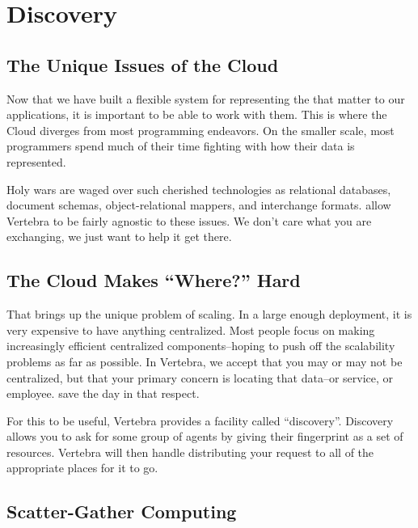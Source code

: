 \section{Discovery}


\subsection{The Unique Issues of the Cloud}

Now that we have built a flexible system for representing the \resources{} that matter to our applications, it is important to be able to work with them.  This is where the Cloud diverges from most programming endeavors.  On the smaller scale, most programmers spend much of their time fighting with how their data is represented.

Holy wars are waged over such cherished technologies as relational databases, document schemas, object-relational mappers, and interchange formats.  \Resources{} allow Vertebra to be fairly agnostic to these issues.  We don't care what you are exchanging, we just want to help it get there.

\subsection{The Cloud Makes ``Where?'' Hard}

That brings up the unique problem of scaling.  In a large enough deployment, it is very expensive to have anything centralized.  Most people focus on making increasingly efficient centralized components--hoping to push off the scalability problems as far as possible.  In Vertebra, we accept that you may or may not be centralized, but that your primary concern is locating that data--or service, or employee.  \Resources{} save the day in that respect.

For this to be useful, Vertebra provides a facility called ``discovery''.  Discovery allows you to ask for some group of agents by giving their fingerprint as a set of resources.  Vertebra will then handle distributing your request to all of the appropriate places for it to go.

\subsection{Scatter-Gather Computing}

